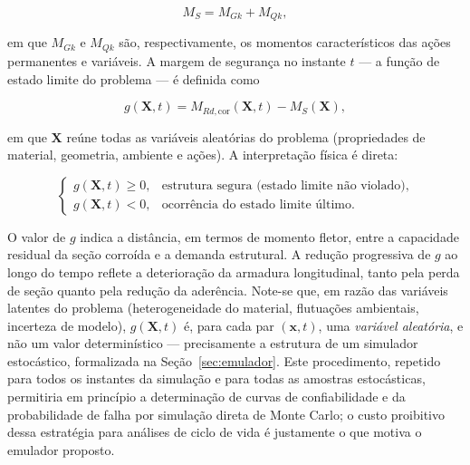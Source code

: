 \begin{equation}\label{eq:ms}
M_S = M_{Gk} + M_{Qk},
\end{equation}

\noindent em que $M_{Gk}$ e $M_{Qk}$ são, respectivamente, os momentos característicos das ações permanentes e variáveis. A margem de segurança no instante $t$ --- a função de estado limite do problema --- é definida como

\begin{equation}\label{eq:funcao_g}
g(\mathbf{X}, t) = M_{Rd,\mathrm{cor}}(\mathbf{X}, t) - M_S(\mathbf{X}),
\end{equation}

\noindent em que $\mathbf{X}$ reúne todas as variáveis aleatórias do problema (propriedades de material, geometria, ambiente e ações). A interpretação física é direta:

\begin{equation}\label{eq:dominio_falha}
\begin{cases}
g(\mathbf{X}, t) \geq 0, & \text{estrutura segura (estado limite não violado)}, \\[4pt]
g(\mathbf{X}, t) < 0,  & \text{ocorrência do estado limite último}.
\end{cases}
\end{equation}

O valor de $g$ indica a distância, em termos de momento fletor, entre a capacidade residual da seção corroída e a demanda estrutural. A redução progressiva de $g$ ao longo do tempo reflete a deterioração da armadura longitudinal, tanto pela perda de seção quanto pela redução da aderência. Note-se que, em razão das variáveis latentes do problema (heterogeneidade do material, flutuações ambientais, incerteza de modelo), $g(\mathbf{X}, t)$ é, para cada par $(\mathbf{x}, t)$, uma \textit{variável aleatória}, e não um valor determinístico --- precisamente a estrutura de um simulador estocástico, formalizada na Seção~\ref{sec:emulador}. Este procedimento, repetido para todos os instantes da simulação e para todas as amostras estocásticas, permitiria em princípio a determinação de curvas de confiabilidade e da probabilidade de falha por simulação direta de Monte Carlo; o custo proibitivo dessa estratégia para análises de ciclo de vida é justamente o que motiva o emulador proposto.

